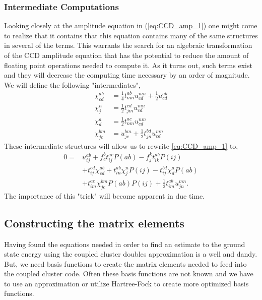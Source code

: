 \documentclass[
    a4paper, aps, twocolumn, floatfix, superscriptaddress,
    nofootinbib]{revtex4-1}
\newcommand{\1}{\mathds{1}}
\begin{document}
        \subsubsection{Intermediate Computations}
        Looking closely at the amplitude equation in (\ref{eq:CCD_amp_1}) one might come
        to realize that it contains that this equation contains many of the same structures in
        several of the terms. This warrants the search for an algebraic transformation of the
        CCD amplitude equation that has the potential to reduce the amount of floating point
        operations needed to compute it. As it turns out, such terms exist and they will decrease
        the computing time necessary by an order of magnitude. We will define the following
        "intermediates",
        \begin{align}
            \label{eq:intermediate1}
            \chi^{ab}_{cd} &= \frac{1}{4}t^{ab}_{mn} u^{mn}_{cd} + \frac{1}{2}u^{ab}_{cd} \\
            \label{eq:intermediate2}
            \chi^n_j &= \frac{1}{2}t^{cd}_{jm} u^{mn}_{cd} \\
            \label{eq:intermediate3}
            \chi^a_d &= \frac{1}{2} t^{ac}_{nm} u^{nm}_{cd} \\
            \label{eq:intermediate4}
            \chi^{bm}_{jc} &= u^{bm}_{jc} + \frac{1}{2}t^{bd}_{jn}u^{mn}_{cd}
        \end{align}
        These intermediate structures will allow us to rewrite \autoref{eq:CCD_amp_1} to,
        \begin{equation}
        \begin{aligned}
            0 =& u^{ab}_{ij} + f^b_c t^{ac}_{ij}P(ab) - f^k_jt^{ab}_{ik}P(ij) \\
              &+ t^{cd}_{ij}\chi^{ab}_{cd} + t^{ab}_{in}\chi^n_jP(ij)
               - t^{bd}_{ij}\chi^a_dP(ab) \\
              &+ t^{ac}_{im}\chi^{bm}_{jc}P(ab)P(ij) + \frac{1}{2}t^{ab}_{im}u^{mn}_{jn}.
        \end{aligned}
        \end{equation}
        The importance of this "trick" will become apparent in due time.

    \subsection{Constructing the matrix elements}
        Having found the equations needed in order to find an estimate to the
        ground state energy using the coupled cluster doubles approximation is a
        well and dandy. But, we need basis functions to create the matrix
        elements needed to feed into the coupled cluster code.  Often these
        basis functions are not known and we have to use an approximation or
        utilize Hartree-Fock to create more optimized basis functions.
\end{document}
